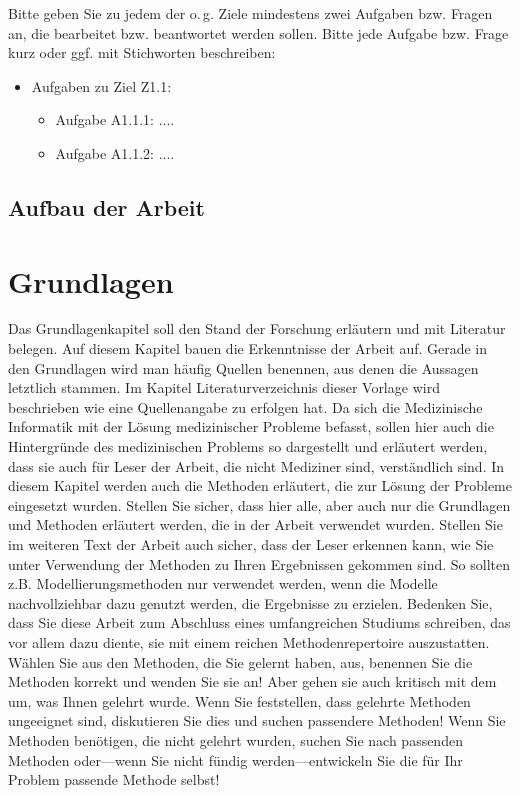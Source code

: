 \documentclass[headsepline,titlepage,twoside,12pt]{report}
\begin{document}
Bitte geben Sie zu jedem der o.\,g. Ziele mindestens zwei Aufgaben bzw. Fragen an, die bearbeitet bzw. beantwortet werden sollen. Bitte jede Aufgabe bzw. Frage kurz oder ggf. mit Stichworten beschreiben:

\begin{itemize}
\item Aufgaben zu Ziel Z1.1:
	\begin{itemize}
	\item Aufgabe A1.1.1: ....
	\item Aufgabe A1.1.2: ....
	\end{itemize}
\end{itemize}

\section{Aufbau der Arbeit}

\chapter{Grundlagen}

Das Grundlagenkapitel soll den Stand der Forschung erläutern und mit Literatur belegen. Auf diesem Kapitel bauen die Erkenntnisse der Arbeit auf. Gerade in den Grundlagen wird man häufig Quellen benennen, aus denen die Aussagen letztlich stammen. Im Kapitel \glqq Literaturverzeichnis \grqq dieser Vorlage wird beschrieben wie eine Quellenangabe zu erfolgen hat.
Da sich die Medizinische Informatik mit der Lösung medizinischer Probleme befasst, sollen hier auch die Hintergründe des medizinischen Problems so dargestellt und erläutert werden, dass sie auch für Leser der Arbeit, die nicht Mediziner sind, verständlich sind.
In diesem Kapitel werden auch die Methoden erläutert, die zur Lösung der Probleme eingesetzt wurden. Stellen Sie sicher, dass hier alle, aber auch nur die Grundlagen und Methoden erläutert werden, die in der Arbeit verwendet wurden. Stellen Sie im weiteren Text der Arbeit auch sicher, dass der Leser erkennen kann, wie Sie unter Verwendung der Methoden zu Ihren Ergebnissen gekommen sind. So sollten z.B. Modellierungsmethoden nur verwendet werden, wenn die Modelle nachvollziehbar dazu genutzt werden, die Ergebnisse zu erzielen.
Bedenken Sie, dass Sie diese Arbeit zum Abschluss eines umfangreichen Studiums schreiben, das vor allem dazu diente, sie mit einem reichen Methodenrepertoire auszustatten. Wählen Sie aus den Methoden, die Sie gelernt haben, aus, benennen Sie die Methoden korrekt und wenden Sie sie an! Aber gehen sie auch kritisch mit dem um, was Ihnen gelehrt wurde. Wenn Sie feststellen, dass gelehrte Methoden ungeeignet sind, diskutieren Sie dies und suchen passendere Methoden! Wenn Sie Methoden benötigen, die nicht gelehrt wurden, suchen Sie nach passenden Methoden oder---wenn Sie nicht fündig werden---entwickeln Sie die für Ihr Problem passende Methode selbst!
\end{document}

